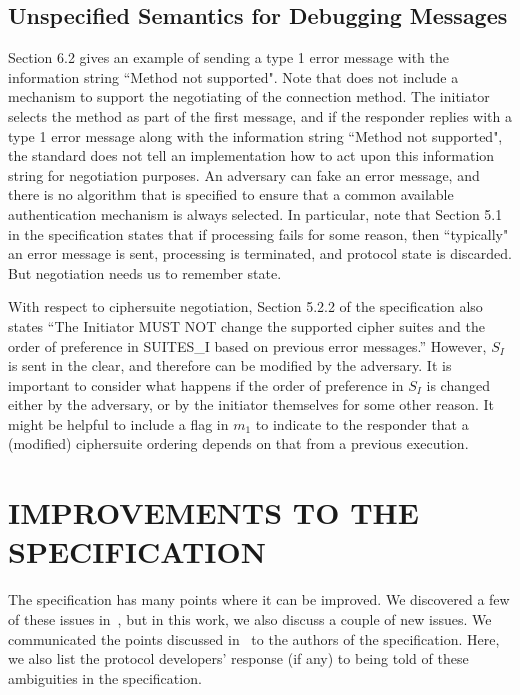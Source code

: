 \documentclass[runningheads]{llncs}
\newcommand{\mProtocolStyle}[1]{\text{#1}}
\newcommand{\mSpec}{specification}  %
\newcommand{\mEdhoc}{\mProtocolStyle{EDHOC}}
\newcommand{\mSuites}{\ensuremath{S_I}}
\newcommand{\mMsgone}{\ensuremath{m_1}}
\begin{document}
\subsection{Unspecified Semantics for Debugging Messages}
Section 6.2 gives an example of sending a type 1 error message with the
information string ``Method not supported".
%
Note that \mEdhoc{} does not include a mechanism to support the
negotiating of the connection method.
%
The initiator selects the method as part of the first message, and if the
responder replies with a type 1 error message along with the information
string ``Method not supported", the standard does not tell an
implementation how to act upon this information string for negotiation
purposes.
%
An adversary can fake an error message, and there is no algorithm that is
specified to ensure that a common available authentication mechanism is
always selected.
%
In particular, note that Section 5.1 in the specification states that if processing
fails for some reason, then ``typically" an error message is sent, processing is
terminated, and protocol state is discarded.
%
But negotiation needs us to remember state.

With respect to ciphersuite negotiation, Section 5.2.2 of the specification also
states ``The Initiator MUST NOT change the supported cipher suites and
the order of preference in SUITES\_I based on previous error messages.''
%
However, \mSuites{} is sent in the clear, and therefore can be modified by the
adversary.
%
It is important to consider what happens if the order of preference in
\mSuites{} is changed either by the adversary, or by the initiator themselves
for some other reason.
%
It might be helpful to include a flag in \mMsgone{} to indicate to the
responder
that a (modified) ciphersuite ordering depends on that from a previous
execution.

\section{\uppercase{Improvements to the Specification}}
\label{sec:discussion}
The \mEdhoc{} \mSpec{} has many points where it can be improved.
%
We discovered a few of these issues in~\cite{Norr21}, but in this work,
we also discuss a couple of new issues.
%
We communicated the points discussed in~\cite{Norr21} to the authors of the
\mSpec{}.
%
Here, we also list the protocol developers' response (if any) to being told of these
ambiguities in the \mSpec{}.
\end{document}
